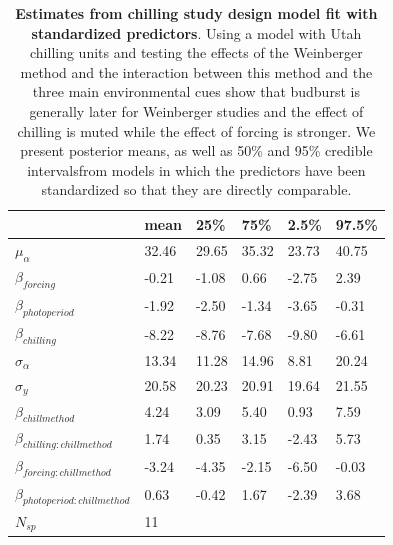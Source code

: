 \documentclass{article}
\begin{document}
\begin{footnotesize}
\begin{table}[ht]
\centering
\caption{\textbf{Estimates from chilling study design model fit with standardized predictors}. Using a model with Utah chilling units and testing the effects of the Weinberger method and the interaction between this method and the three main environmental cues  show that budburst is generally later for Weinberger studies and the effect of chilling is muted while the effect of forcing is stronger. We present posterior means, as well as 50\% and 95\% credible intervalsfrom models in which the predictors have been standardized so that they are directly comparable.} 
\label{tab:methods}
\begingroup\footnotesize
\begin{tabular}{|p{}|p{}|p{}|p{}|p{}|p{}|}
  \hline
 & mean & 25\% & 75\% & 2.5\% & 97.5\% \\ 
  \hline
$\mu_{\alpha}$ & 32.46 & 29.65 & 35.32 & 23.73 & 40.75 \\ 
  $\beta_{forcing}$ & -0.21 & -1.08 & 0.66 & -2.75 & 2.39 \\ 
  $\beta_{photoperiod}$ & -1.92 & -2.50 & -1.34 & -3.65 & -0.31 \\ 
  $\beta_{chilling}$ & -8.22 & -8.76 & -7.68 & -9.80 & -6.61 \\ 
  $\sigma_{\alpha}$ & 13.34 & 11.28 & 14.96 & 8.81 & 20.24 \\ 
  $\sigma_{y}$ & 20.58 & 20.23 & 20.91 & 19.64 & 21.55 \\ 
  $\beta_{chillmethod}$ & 4.24 & 3.09 & 5.40 & 0.93 & 7.59 \\ 
  $\beta_{chilling : chillmethod}$ & 1.74 & 0.35 & 3.15 & -2.43 & 5.73 \\ 
  $\beta_{forcing : chillmethod}$ & -3.24 & -4.35 & -2.15 & -6.50 & -0.03 \\ 
  $\beta_{photoperiod : chillmethod}$ & 0.63 & -0.42 & 1.67 & -2.39 & 3.68 \\ 
   \hline
$N_{sp}$ & 11 &  &  &  &  \\ 
   \hline
\end{tabular}
\endgroup
\end{table}


\end{footnotesize}
\end{document}
